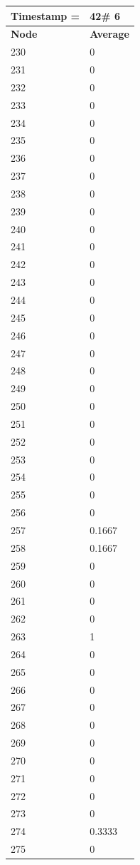 \begin{tabular}{|l||l|}
\hline
\textbf{Timestamp =} & \textbf{42}\# 6\\\hline
	\textbf{Node} & \textbf{Average} \\ \hline
\hline
	230 & 0 \\ \hline
	231 & 0 \\ \hline
	232 & 0 \\ \hline
	233 & 0 \\ \hline
	234 & 0 \\ \hline
	235 & 0 \\ \hline
	236 & 0 \\ \hline
	237 & 0 \\ \hline
	238 & 0 \\ \hline
	239 & 0 \\ \hline
	240 & 0 \\ \hline
	241 & 0 \\ \hline
	242 & 0 \\ \hline
	243 & 0 \\ \hline
	244 & 0 \\ \hline
	245 & 0 \\ \hline
	246 & 0 \\ \hline
	247 & 0 \\ \hline
	248 & 0 \\ \hline
	249 & 0 \\ \hline
	250 & 0 \\ \hline
	251 & 0 \\ \hline
	252 & 0 \\ \hline
	253 & 0 \\ \hline
	254 & 0 \\ \hline
	255 & 0 \\ \hline
	256 & 0 \\ \hline
	257 & 0.1667 \\ \hline
	258 & 0.1667 \\ \hline
	259 & 0 \\ \hline
	260 & 0 \\ \hline
	261 & 0 \\ \hline
	262 & 0 \\ \hline
	263 & 1 \\ \hline
	264 & 0 \\ \hline
	265 & 0 \\ \hline
	266 & 0 \\ \hline
	267 & 0 \\ \hline
	268 & 0 \\ \hline
	269 & 0 \\ \hline
	270 & 0 \\ \hline
	271 & 0 \\ \hline
	272 & 0 \\ \hline
	273 & 0 \\ \hline
	274 & 0.3333 \\ \hline
	275 & 0 \\ \hline
\end{tabular}


